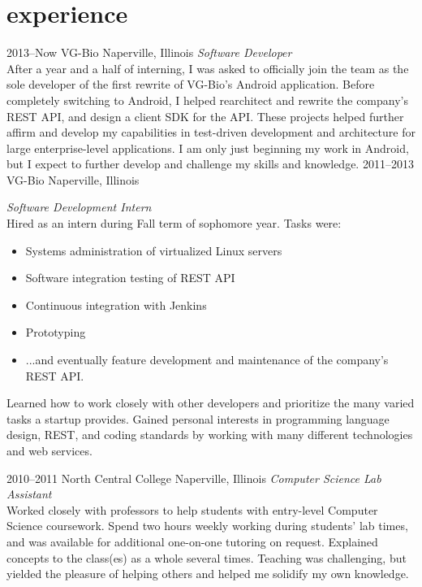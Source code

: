 \documentclass[]{friggeri-cv} %
\begin{document}

\section{experience}

\begin{entrylist}
\entry
{2013--Now}
{VG-Bio}
{Naperville, Illinois}
{\emph{Software Developer} \\
    After a year and a half of interning, I was asked to officially join the team as the sole developer of the first rewrite of VG-Bio's Android application.
    Before completely switching to Android, I helped rearchitect and rewrite the company's REST API, and design a client SDK for the API.
    These projects helped further affirm and develop my capabilities in test-driven development and architecture for large enterprise-level applications.
    I am only just beginning my work in Android, but I expect to further develop and challenge my skills and knowledge.
}
\entry
{2011--2013}
{VG-Bio}
{Naperville, Illinois}
{\emph{Software Development Intern} \\
    Hired as an intern during Fall term of sophomore year.
    Tasks were:
    \begin{itemize}
        \item Systems administration of virtualized Linux servers
        \item Software integration testing of REST API
        \item Continuous integration with Jenkins
        \item Prototyping
        \item ...and eventually feature development and maintenance of the company's REST API.
    \end{itemize}
    Learned how to work closely with other developers and prioritize the many varied tasks a startup provides.
    Gained personal interests in programming language design, REST, and coding standards by working with many different technologies and web services.}
\entry
{2010--2011}
{North Central College}
{Naperville, Illinois}
{\emph{Computer Science Lab Assistant} \\
Worked closely with professors to help students with entry-level Computer Science coursework.
Spend two hours weekly working during students' lab times, and was available for additional one-on-one tutoring on request.
Explained concepts to the class(es) as a whole several times.
Teaching was challenging, but yielded the pleasure of helping others and helped me solidify my own knowledge.}
\end{entrylist}
\end{document}
